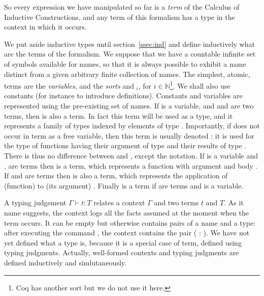 So every expression we have manipulated so far is a \emph{term} of the
Calculus of Inductive Constructions, and any term of this formalism
has a type in the context in which it occurs.

We put aside inductive types until section~\ref{ssec:ind} and define
inductively what are the terms of the formalism. We suppose that we
have a countable infinite set of symbols available for names, so that it is
always possible to exhibit a name distinct from a given arbitrary
finite collection of names. The simplest, atomic, terms are the
\emph{variables}, and the \emph{sorts}  and $_i$, for
$i \in \mathbb{N}$\footnote{Coq has
another sort  but we do not use it here.}. We shall also
use constants (for instance to introduce definitions). Constants and
variables are represented using the pre-existing set of names. If  is a
variable, and  and  are two terms, then  is
also a term. In fact this term will be used as a type, and it
represents a family of types  indexed by elements of type .
Importantly, if  does not occur in term  as a
free variable, then this term is usually denoted : it is
used for the type of functions having their argument of type  and
their results of type . There is thus no difference
between  and , except the
notation. If  is a variable and , 
are terms then  is a term, which represents a function
with argument  and body . If  and  are terms then
 is also a term, which represents the application of (function)
 to (its argument) . Finally  is a term
if  are terms and  is a variable.

A typing judgement $\Gamma \vdash t : T$ relates a
context $\Gamma$ and two terms $t$ and $T$. As it name suggests,
the context logs all the facts assumed at the moment when the term
occurs. It can be empty but otherwise contains pairs of a name and a
type: after executing the command , the context
contains the pair ( : ). We have not yet defined what a
type is, because it is a special case of term, defined using typing
judgments. Actually, well-formed contexts and typing judgments are
defined inductively and simlutaneously.

